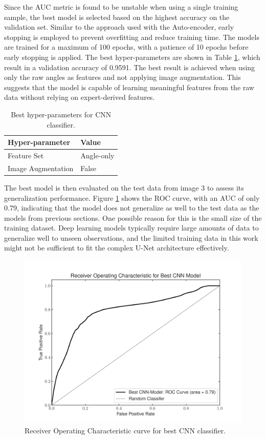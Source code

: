 \documentclass[11pt,letterpaper]{article}
\begin{document}
Since the AUC metric is found to be unstable when using a single training sample, the best model is selected based on the highest accuracy on the validation set. Similar to the approach used with the Auto-encoder, early stopping is employed to prevent overfitting and reduce training time. The models are trained for a maximum of 100 epochs, with a patience of 10 epochs before early stopping is applied. The best hyper-parameters are shown in Table \ref{table:cnn_best_hp}, which result in a validation accuracy of 0.9591. The best result is achieved when using only the raw angles as features and not applying image augmentation. This suggests that the model is capable of learning meaningful features from the raw data without relying on expert-derived features.

\begin{table}[]
\centering
\begin{tabular}{|l|l|}
\hline
\textbf{Hyper-parameter} & \textbf{Value}                    \\ \hline
Feature Set             & Angle-only                         \\
Image Augmentation      & False                              \\ \hline
\end{tabular}
\caption{Best hyper-parameters for CNN classifier.}
\label{table:cnn_best_hp}
\end{table}

The best model is then evaluated on the test data from image 3 to assess its generalization performance. Figure \ref{fig_roc_cnn} shows the ROC curve, with an AUC of only 0.79, indicating that the model does not generalize as well to the test data as the models from previous sections. One possible reason for this is the small size of the training dataset. Deep learning models typically require large amounts of data to generalize well to unseen observations, and the limited training data in this work might not be sufficient to fit the complex U-Net architecture effectively.

\begin{figure}[H]
    \centering
    \includegraphics[width=0.9\linewidth]{figs/roc_cnn.pdf}
    \caption{Receiver Operating Characteristic curve for best CNN classifier.}
    \label{fig_roc_cnn}
\end{figure}
\end{document}
